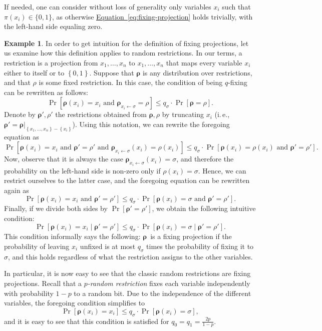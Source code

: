 \documentclass[11pt]{article}
\numberwithin{equation}{section}
\theoremstyle{definition}
\newtheorem{example}[theorem]{Example}
\theoremstyle{plain}
\newcommand{\ie}{i.\,e.}
\newcommand{\expref}[2]{\hyperref[#2]{#1~\ref{#2}}}
\theoremstyle{definition}\newtheorem{notation}[theorem]{Notation}\theoremstyle{plain}
\newcommand{\B}{\left\{ 0,1 \right \}}
\newcommand{\rs}{\boldsymbol{\rho}}
\theoremstyle{definition}
\theoremstyle{plain}
\begin{document}
If needed, one can consider without loss of generality only variables
$x_{i}$ such that $\pi(x_{i})\in\{0,1\}$, as otherwise \expref{Equation}{eq:fixing-projection}
holds trivially, with the left-hand side equaling zero.
\begin{example}
In order to get intuition for the definition of fixing projections,
let us examine how this definition applies to random restrictions.
In our terms, a restriction is a projection from $x_{1},\ldots,x_{n}$
to $x_{1},\ldots,x_{n}$ that maps every variable $x_{i}$ either
to itself or to $\B$. Suppose that $\rs$ is any distribution over
restrictions, and that $\rho$ is some fixed restriction. In this
case, the condition of being $q$-fixing can be rewritten as follows:
\[
\Pr\!\left[\rs(x_{i})=x_{i}\text{ and }\rs_{x_{i}\gets\sigma}=\rho\right]\le q_{\sigma}\cdot\Pr\!\left[\rs=\rho\right].
\]
Denote by $\rs',\rho'$ the restrictions obtained from $\rs,\rho$
by truncating $x_{i}$ (\ie, $\rs'=\rs|_{\left\{ x_{1},\ldots,x_{n}\right\} -\left\{ x_{i}\right\} }$).
Using this notation, we can rewrite the foregoing equation as 
\[
\Pr\!\left[\rs(x_{i})=x_{i}\text{ and }\rs'=\rho'\text{ and }\rs_{x_{i}\gets\sigma}(x_{i})=\rho(x_{i})\right]\le q_{\sigma}\cdot\Pr\!\left[\rs(x_{i})=\rho(x_{i})\text{ and }\rs'=\rho'\right].
\]
Now, observe that it is always the case $\rs_{x_{i}\gets\sigma}(x_{i})=\sigma$,
and therefore the probability on the left-hand side is non-zero only
if $\rho(x_{i})=\sigma$. Hence, we can restrict ourselves to the
latter case, and the foregoing equation can be rewritten again as
\[
\Pr\!\left[\rs(x_{i})=x_{i}\text{ and }\rs'=\rho'\right]\le q_{\sigma}\cdot\Pr\!\left[\rs(x_{i})=\sigma\text{ and }\rs'=\rho'\right].
\]
Finally, if we divide both sides by $\Pr\!\left[\rs'=\rho'\right]$,
we obtain the following intuitive condition: 
\[
\Pr\!\left[\rs(x_{i})=x_{i}\mid\rs'=\rho'\right]\le q_{\sigma}\cdot\Pr\!\left[\rs(x_{i})=\sigma\mid\rs'=\rho'\right].
\]
This condition informally says the following: $\rs$~is a fixing
projection if the probability of leaving $x_{i}$ unfixed is at most
$q_{\sigma}$ times the probability of fixing it to $\sigma$, and
this holds regardless of what the restriction assigns to the other
variables.

In particular, it is now easy to see that the classic random restrictions
are fixing projections. Recall that a $p$\emph{-random restriction}
fixes each variable independently with probability $1-p$ to a random
bit. Due to the independence of the different variables, the foregoing
condition simplifies to 
\[
\Pr\!\left[\rs(x_{i})=x_{i}\right]\le q_{\sigma}\cdot\Pr\!\left[\rs(x_{i})=\sigma\right],
\]
and it is easy to see that this condition is satisfied for $q_{0}=q_{1}=\frac{2p}{1-p}$. 
\end{example}
\end{document}
